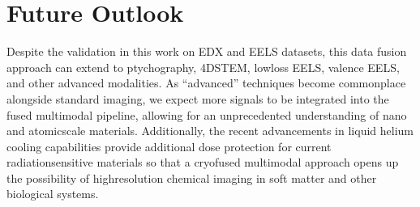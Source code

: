 \documentclass[letterpaper,10pt,english]{jupyterBook}
\begin{document}
\chapter{Future Outlook}
\label{\detokenize{06_conclusion:future-outlook}}\label{\detokenize{06_conclusion:future}}
\sphinxAtStartPar
Despite the validation in this work on EDX and EELS datasets, this data fusion approach can extend to ptychography, 4D\sphinxhyphen{}STEM, low\sphinxhyphen{}loss EELS, valence EELS, and other advanced modalities. As “advanced” techniques become commonplace alongside standard imaging, we expect more signals to be integrated into the fused multi\sphinxhyphen{}modal pipeline, allowing for an unprecedented understanding of nano\sphinxhyphen{} and atomic\sphinxhyphen{}scale materials. Additionally, the recent advancements in liquid helium cooling capabilities provide additional dose protection for current radiation\sphinxhyphen{}sensitive materials so that a cryo\sphinxhyphen{}fused multi\sphinxhyphen{}modal approach opens up the possibility of high\sphinxhyphen{}resolution chemical imaging in soft matter and other biological systems.







\renewcommand{\indexname}{Index}
\printindex
\end{document}
